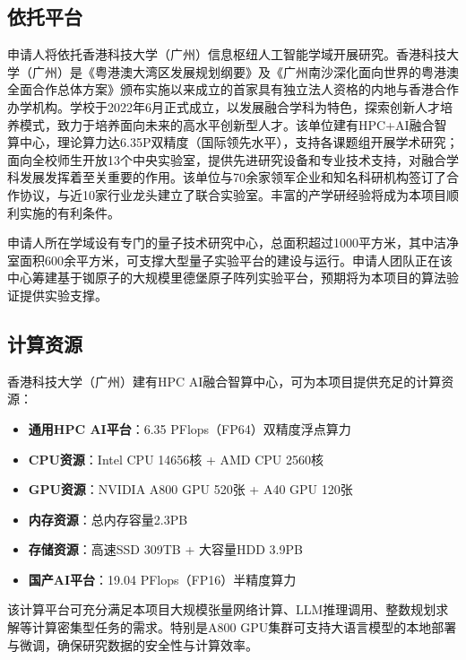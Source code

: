 
\subsection*{依托平台}

申请人将依托香港科技大学（广州）信息枢纽人工智能学域开展研究。香港科技大学（广州）是《粤港澳大湾区发展规划纲要》及《广州南沙深化面向世界的粤港澳全面合作总体方案》颁布实施以来成立的首家具有独立法人资格的内地与香港合作办学机构。学校于2022年6月正式成立，以发展融合学科为特色，探索创新人才培养模式，致力于培养面向未来的高水平创新型人才。该单位建有HPC+AI融合智算中心，理论算力达6.35P双精度（国际领先水平），支持各课题组开展学术研究；面向全校师生开放13个中央实验室，提供先进研究设备和专业技术支持，对融合学科发展发挥着至关重要的作用。该单位与70余家领军企业和知名科研机构签订了合作协议，与近10家行业龙头建立了联合实验室。丰富的产学研经验将成为本项目顺利实施的有利条件。

申请人所在学域设有专门的量子技术研究中心，总面积超过1000平方米，其中洁净室面积600余平方米，可支撑大型量子实验平台的建设与运行。申请人团队正在该中心筹建基于铷原子的大规模里德堡原子阵列实验平台，预期将为本项目的算法验证提供实验支撑。

\subsection*{计算资源}

香港科技大学（广州）建有HPC AI融合智算中心，可为本项目提供充足的计算资源：

\begin{itemize}[leftmargin=2em, topsep=0pt, itemsep=2pt]
\item \textbf{通用HPC AI平台}：6.35 PFlops（FP64）双精度浮点算力
\item \textbf{CPU资源}：Intel CPU 14656核 + AMD CPU 2560核
\item \textbf{GPU资源}：NVIDIA A800 GPU 520张 + A40 GPU 120张
\item \textbf{内存资源}：总内存容量2.3PB
\item \textbf{存储资源}：高速SSD 309TB + 大容量HDD 3.9PB
\item \textbf{国产AI平台}：19.04 PFlops（FP16）半精度算力
\end{itemize}

该计算平台可充分满足本项目大规模张量网络计算、LLM推理调用、整数规划求解等计算密集型任务的需求。特别是A800 GPU集群可支持大语言模型的本地部署与微调，确保研究数据的安全性与计算效率。


